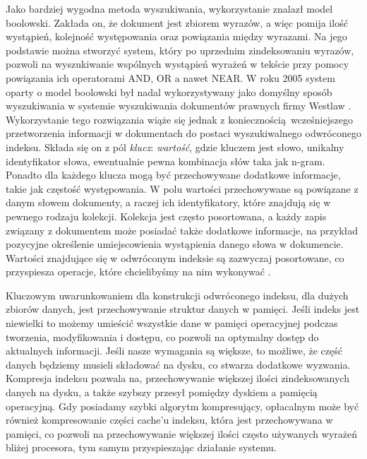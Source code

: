 Jako bardziej wygodna metoda wyszukiwania, wykorzystanie znalazł model boolowski. Zakłada on, że dokument jest zbiorem wyrazów, a więc pomija ilość wystąpień, kolejność występowania oraz powiązania między wyrazami. Na jego podstawie można stworzyć system, który po uprzednim zindeksowaniu wyrazów, pozwoli na wyszukiwanie wspólnych
wystąpień wyrażeń w tekście przy pomocy powiązania ich operatorami AND, OR a nawet NEAR. W roku
2005 system oparty o model boolowski był nadal wykorzystywany jako domyślny sposób
wyszukiwania w systemie wyszukiwania dokumentów prawnych firmy Westlaw \autocite[s. 38-56]{introtoinformationretrieval}. Wykorzystanie tego rozwiązania wiąże się jednak z koniecznością wcześniejszego przetworzenia informacji w dokumentach do postaci wyszukiwalnego odwróconego indeksu. Składa
się on z pól {\it klucz}: {\it wartość}, gdzie kluczem jest słowo, unikalny identyfikator słowa, ewentualnie
pewna kombinacja słów taka jak n-gram. Ponadto dla każdego klucza mogą być przechowywane
dodatkowe informacje, takie jak częstość występowania. W polu wartości przechowywane są powiązane z danym słowem dokumenty, a raczej ich identyfikatory, które znajdują się w pewnego
rodzaju kolekcji. Kolekcja jest często posortowana, a każdy zapis związany z dokumentem może
posiadać także dodatkowe informacje, na przykład pozycyjne określenie umiejscowienia
wystąpienia danego słowa w dokumencie. Wartości znajdujące się w odwróconym indeksie są zazwyczaj posortowane, co
przyspiesza operacje, które chcielibyśmy na nim wykonywać \autocite[s. 104-122]{introtoinformationretrieval}.\newline

Kluczowym uwarunkowaniem dla konstrukcji odwróconego indeksu, dla dużych zbiorów
danych, jest przechowywanie struktur danych w pamięci. Jeśli indeks jest niewielki to możemy umieścić
wszystkie dane w pamięci operacyjnej podczas tworzenia, modyfikowania i dostępu, co pozwoli na
optymalny dostęp do aktualnych informacji. Jeśli nasze wymagania są większe, to możliwe, że część danych
będziemy musieli składować na dysku, co stwarza dodatkowe wyzwania. Kompresja indeksu pozwala
na, przechowywanie większej ilości zindeksowanych danych na dysku, a także szybszy przesył pomiędzy
dyskiem a pamięcią operacyjną. Gdy posiadamy szybki algorytm kompresujący, opłacalnym może być
również kompresowanie części cache'u indeksu, która jest przechowywana w pamięci, co pozwoli na przechowywanie większej ilości często używanych wyrażeń bliżej procesora, tym samym przyspieszając działanie systemu.\newline

